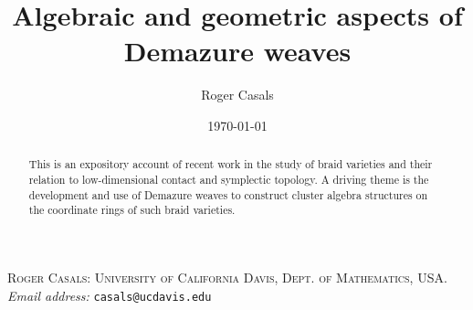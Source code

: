 \documentclass[11pt,letter,reqno]{amsart}
\title{Algebraic and geometric aspects of Demazure weaves}
\author{Roger Casals}
\date{\today}
\begin{document}
\maketitle

\begin{abstract}
This is an expository account of recent work in the study of braid varieties and their relation to low-dimensional contact and symplectic topology. A driving theme is the development and use of Demazure weaves to construct cluster algebra structures on the coordinate rings of such braid varieties.
\end{abstract}

\setcounter{tocdepth}{1}
\tableofcontents





















 


\textsc{Roger Casals: University of California Davis, Dept. of Mathematics, USA.\\}
\textit{Email address:} \texttt{casals@ucdavis.edu}
\vspace{0.2cm}
\end{document}
